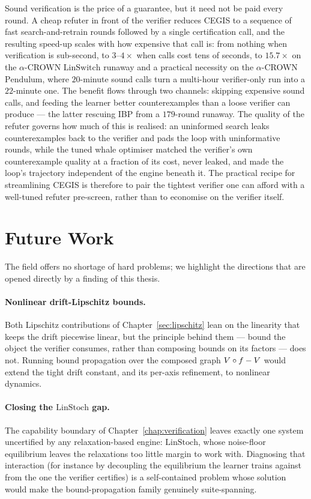 Sound verification is the price of a guarantee, but it need not be paid every
round. A cheap refuter in front of the verifier reduces CEGIS to a sequence
of fast search-and-retrain rounds followed by a single certification call,
and the resulting speed-up scales with how expensive that call is: from
nothing when verification is sub-second, to $3$--$4\times$ when calls cost
tens of seconds, to $15.7\times$ on the $\alpha$-CROWN $\mathrm{LinSwitch}$ runaway and a
practical necessity on the $\alpha$-CROWN $\mathrm{Pendulum}$, where $20$-minute sound
calls turn a multi-hour verifier-only run into a $22$-minute one. The benefit
flows through two channels: skipping
expensive sound calls, and feeding the learner better counterexamples than a
loose verifier can produce --- the latter rescuing IBP from a $179$-round
runaway. The quality of the refuter governs how much of this is realised: an
uninformed search leaks counterexamples back to the verifier and pads the
loop with uninformative rounds, while the tuned whale optimiser matched the
verifier's own counterexample quality at a fraction of its cost, never
leaked, and made the loop's trajectory independent of the engine beneath it.
The practical recipe for streamlining CEGIS is therefore to pair the tightest
verifier one can afford with a well-tuned refuter pre-screen, rather than to
economise on the verifier itself.

\section{Future Work}

The field offers no shortage of hard problems; we highlight the directions that
are opened directly by a finding of this thesis.

\paragraph{Nonlinear drift-Lipschitz bounds.} Both Lipschitz contributions of
Chapter~\ref{sec:lipschitz} lean on the linearity that keeps the drift
piecewise linear, but the principle behind them --- bound the object the
verifier consumes, rather than composing bounds on its factors --- does not.
Running bound propagation over the composed graph $V \circ f - V$
would extend the tight drift constant, and its per-axis refinement, to
nonlinear dynamics.

\paragraph{Closing the $\mathrm{LinStoch}$ gap.} The capability boundary of
Chapter~\ref{chap:verification} leaves exactly one system uncertified by any
relaxation-based engine: $\mathrm{LinStoch}$, whose noise-floor equilibrium
leaves the relaxations too little margin to work with. Diagnosing that
interaction (for instance by decoupling the equilibrium the learner trains
against from the one the verifier certifies) is a self-contained problem
whose solution would make the bound-propagation family genuinely
suite-spanning.


